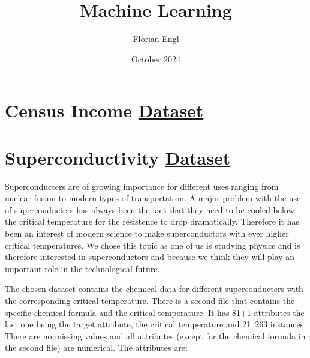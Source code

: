 \documentclass{article}[a4paper,12pt]
\title{Machine Learning}
\author{Florian Engl}
\date{October 2024}
\begin{document}
\maketitle

\section{Census Income \href{https://archive.ics.uci.edu/dataset/2/adult}{Dataset}}

\section{Superconductivity \href{https://archive.ics.uci.edu/dataset/464/superconductivty+data}{Dataset}}

Superconducters are of growing importance for different uses ranging from nuclear fusion to modern types of transportation. A major problem with the use of superconducters has always been the fact that they need to be cooled below the critical temperature for the resistence to drop dramatically. Therefore it has been an interest of modern science to make superconductors with ever higher critical temperatures. We chose this topic as one of us is studying physics and is therefore interested in superconductors and because we think they will play an important role in the technological future.
\vspace{4mm}

The chosen dataset contains the chemical data for different superconducters with the corresponding critical temperature. There is a second file that contains the specific chemical formula and the critical temperature. It has 81+1 attributes the last one being the target attribute, the critical temperature and 21~263 instances. There are no missing values and all attributes (except for the chemical formula in the second file) are numerical. The attributes are:
\end{document}
